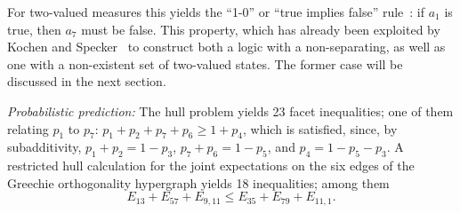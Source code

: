 For two-valued measures this yields the ``1-0'' or ``true implies false'' rule~\cite{svozil-2006-omni}:
if $a_1$ is true, then $a_7$ must be false.
This property,
which has already been exploited by Kochen and Specker~\cite[$\Gamma_1$]{kochen1}
to construct both a logic with a non-separating,
as well as one with a non-existent set of two-valued states. The former case will be discussed in the next section.

{\em Probabilistic prediction:}
The hull problem yields 23 facet inequalities; one of them relating $p_1$  to $p_7$:
$p_1 + p_2   + p_7  + p_6 \ge  1  + p_4$,
which is satisfied, since, by subadditivity,
$p_1 + p_2 = 1 - p_3$,
$p_7 + p_6 = 1 - p_5$,
and
$p_4 = 1 - p_5 - p_3$.
A restricted hull calculation for the joint expectations on the six edges of the Greechie orthogonality hypergraph yields 18 inequalities; among them
\begin{equation}
E_{13}  + E_{57} + E_{9,11} \le   E_{35} + E_{79} +   E_{11,1}
.
\label{2017-b-sp-hcrc}
\end{equation}



